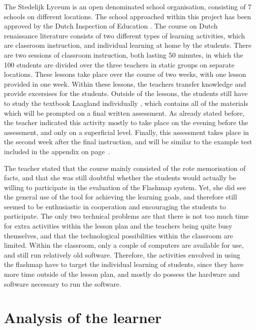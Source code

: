 The Stedelijk Lyceum is an open denominated school organisation, consisting of 7 schools on different locations. The school approached within this project has been approved by the Dutch Inspection of Education \cite{inspectierapport}. The course on Dutch renaissance literature consists of two different types of learning activities, which are classroom instruction, and individual learning at home by the students. There are two sessions of classroom instruction, both lasting 50 minutes, in which the 100 students are divided over the three teachers in static groups on separate locations. These lessons take place over the course of two weeks, with one lesson provided in one week. Within these lessons, the teachers transfer knowledge and provide excersises for the students. Outside of the lessons, the students still have to study the textbook Laagland individually \cite{laagland}, which contains all of the materials which will be prompted on a final written assessment. As already stated before, the teacher indicated this activity mostly to take place on the evening before the assessment, and only on a superficial level. Finally, this assessment takes place in the second week after the final instruction, and will be similar to the example test included in the appendix on page~\pageref{app:exampletest}.

The teacher stated that the course mainly consisted of the rote memorisation of facts, and that she was still doubtful whether the students would actually be willing to participate in the evaluation of the Flashmap system. Yet, she did see the general use of the tool for achieving the learning goals, and therefore still seemed to be enthusiastic in cooperation and encouraging the students to participate. The only two technical problems are that there is not too much time for extra activities within the lesson plan and the teachers being quite busy themselves, and that the technological possibilities within the classroom are limited. Within the classroom, only a couple of computers are available for use, and still run relatively old software. Therefore, the activities envolved in using the flashmap have to target the individual learning of students, since they have more time outside of the lesson plan, and mostly do possess the hardware and software necessary to run the software.

\section{Analysis of the learner}

